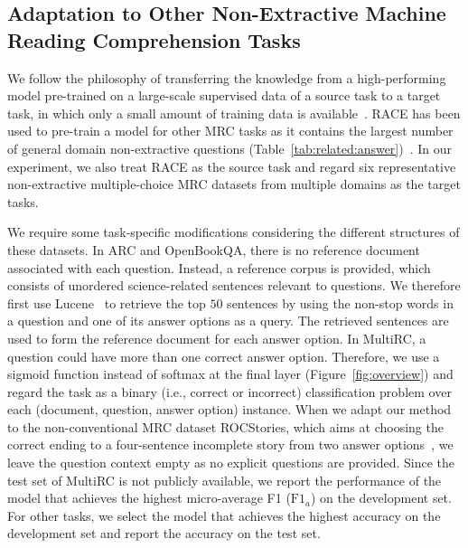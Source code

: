 \documentclass[11pt,a4paper]{article}
\newcommand{\ie}{{i.e.}}
\begin{document}
\subsection{Adaptation to Other Non-Extractive Machine Reading Comprehension Tasks}
\label{sec:eval:five}



We follow the philosophy of transferring the knowledge from a high-performing model pre-trained on a large-scale supervised data of a source task to a target task, in which only a small amount of training data is available~\cite{chung2017supervised}. RACE has been used to pre-train a model for other MRC tasks as it contains the largest number of general domain non-extractive questions (Table~\ref{tab:related:answer})~\cite{ostermann2018semeval,wang2018yuanfudao}. In our experiment, we also treat RACE as the source task and regard six representative non-extractive multiple-choice MRC datasets from multiple domains as the target tasks. 



We require some task-specific modifications considering the different structures of these datasets. In ARC and OpenBookQA, there is no reference document associated with each question. Instead, a reference corpus is provided, which consists of unordered science-related sentences relevant to questions. We therefore first use Lucene~\cite{lucene} to retrieve the top $50$ sentences by using the non-stop words in a question and one of its answer options as a query. The retrieved sentences are used to form the reference document for each answer option. In MultiRC, a question could have more than one correct answer option. Therefore, we use a sigmoid function instead of softmax at the final layer (Figure~\ref{fig:overview}) and regard the task as a binary (\ie, correct or incorrect) classification problem over each (document, question, answer option) instance. When we adapt our method to the non-conventional MRC dataset ROCStories, which aims at choosing the correct ending to a four-sentence incomplete story from two answer options~\cite{mostafazadeh2016corpus}, we leave the question context empty as no explicit questions are provided. Since the test set of MultiRC is not publicly available, we report the performance of the model that achieves the highest micro-average F1 ($\text{F1}_a$) on the development set. For other tasks, we select the model that achieves the highest accuracy on the development set and report the accuracy on the test set. 
\end{document}
